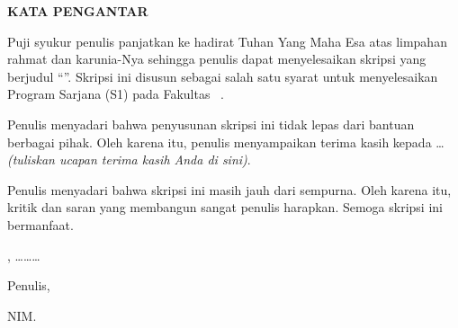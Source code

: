\clearpage
\begin{center}
\textbf{KATA PENGANTAR}
\end{center}
\vspace{0.5cm}
Puji syukur penulis panjatkan ke hadirat Tuhan Yang Maha Esa atas limpahan rahmat
dan karunia-Nya sehingga penulis dapat menyelesaikan skripsi yang berjudul
``\JudulSkripsi''. Skripsi ini disusun sebagai salah satu syarat untuk menyelesaikan
Program Sarjana (S1) pada Fakultas \Fakultas\ \Universitas.

Penulis menyadari bahwa penyusunan skripsi ini tidak lepas dari bantuan berbagai
pihak. Oleh karena itu, penulis menyampaikan terima kasih kepada \ldots
\emph{(tuliskan ucapan terima kasih Anda di sini)}.

Penulis menyadari bahwa skripsi ini masih jauh dari sempurna. Oleh karena itu, kritik
dan saran yang membangun sangat penulis harapkan. Semoga skripsi ini bermanfaat.

\vspace{1cm}
\noindent\hfill \Kota, \ldots\ldots\ldots\ \Tahun

\vspace{0.3cm}
\noindent\hfill Penulis,

\vspace{2cm}
\noindent\hfill \underline{\NamaMahasiswa}

\noindent\hfill NIM. \NIM

\clearpage
{\tableofcontents}
\clearpage
{\listoftables}
\clearpage
{\listoffigures}

\clearpage
{}
\setcounter{page}{1}

\let\QuartoFirstChapter\chapter
\renewcommand{\chapter}{\let\chapter\QuartoFirstChapter\setcounter{chapter}{0}}
